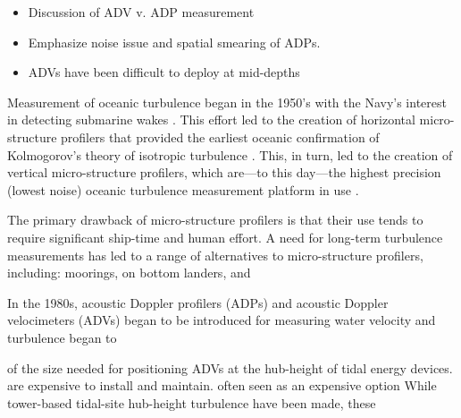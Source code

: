 
\begin{itemize}
\item Discussion of ADV v. ADP measurement
\item Emphasize noise issue and spatial smearing of ADPs.
\item ADVs have been difficult to deploy at mid-depths
\end{itemize}


Measurement of oceanic turbulence began in the 1950's with the Navy's interest in detecting submarine wakes \cite[]{Lueck++2002}. This effort led to the creation of horizontal micro-structure profilers that provided the earliest oceanic confirmation of Kolmogorov's theory of isotropic turbulence \cite[]{Kolmogorov1941a, Grant++1962, Stewart+Grant1999}. This, in turn, led to the creation of vertical micro-structure profilers, which are---to this day---the highest precision (lowest noise) oceanic turbulence measurement platform in use \cite[]{Moum++1995}.

The primary drawback of micro-structure profilers is that their use tends to require significant ship-time and human effort. A need for long-term turbulence measurements has led to a range of alternatives to micro-structure profilers, including: moorings, on bottom landers, and 

In the 1980s, acoustic Doppler profilers (ADPs) and acoustic Doppler velocimeters (ADVs) began to be introduced  for measuring water velocity and turbulence began to 




 of the size needed for positioning ADVs at the hub-height of tidal energy devices.  are expensive to install and maintain. often seen as an expensive option While tower-based tidal-site hub-height turbulence have been made, these 

